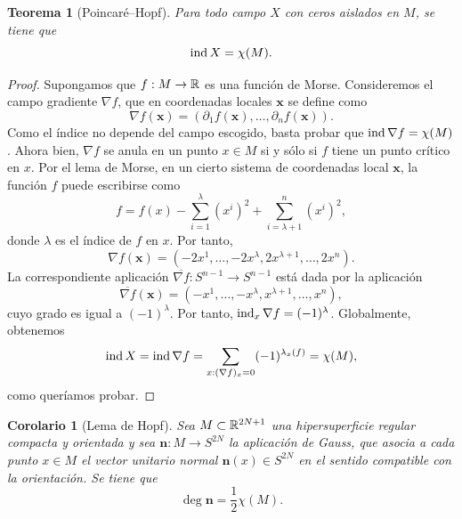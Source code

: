 \documentclass[11pt,a4paper]{amsbook}
\newtheorem{thm}[subsection]{Teorema}
\newtheorem{corol}[subsection]{Corolario}
\theoremstyle{remark} \newtheorem{rmk}[subsection]{Observación}
\theoremstyle{definition} \newtheorem{defn}[subsection]{Definición}
\theoremstyle{definition} \newtheorem{ex}[subsection]{Ejemplo}
\theoremstyle{definition} \newtheorem{ej}[subsection]{Ejercicio}
\begin{document}
\begin{thm}[Poincaré--Hopf]
  Para todo campo $X$ con ceros aislados en $M$, se tiene que
  \begin{equation*}
\operatorname{ind} X = \chi(M).
  \end{equation*}
\end{thm}

\begin{proof}
Supongamos que $f:M\rightarrow \mathbb R$ es una función de Morse. Consideremos el campo gradiente $\nabla f$, que en coordenadas locales $\bm{x}$ se define como
\begin{equation*}
\nabla f(\bm{x}) = (\partial_1 f(\bm{x}),\dots,\partial_n f (\bm{x})).
\end{equation*}
Como el índice no depende del campo escogido, basta probar que $\operatorname{ind} \nabla f = \chi(M)$. Ahora bien, $\nabla f$ se anula en un punto $x\in M$ si y sólo si $f$ tiene un punto crítico en $x$. Por el lema de Morse, en un cierto sistema de coordenadas local $\bm{x}$, la función $f$ puede escribirse como
\begin{equation*}
f = f(x) - \sum_{i=1}^\lambda (x^i)^2 + \sum^n_{i=\lambda+1} (x^i)^2,
\end{equation*}
donde $\lambda$ es el índice de $f$ en $x$. Por tanto,
\begin{equation*}
\nabla f(\bm{x}) = (-2x^1,\dots,-2x^\lambda, 2x^{\lambda+1},\dots,2x^{n}).
\end{equation*}
La correspondiente aplicación $\overline{\nabla f}:S^{n-1}\rightarrow S^{n-1}$ está dada por la aplicación
\begin{equation*}
\overline{\nabla f} (\bm{x}) = (-x^1,\dots,-x^\lambda, x^{\lambda+1},\dots,x^n),
\end{equation*}
cuyo grado es igual a $(-1)^\lambda$. Por tanto, $\operatorname{ind}_x \nabla f = (-1)^\lambda$. Globalmente, obtenemos
\begin{equation*}
\operatorname{ind} X = \operatorname{ind} \nabla f = \sum_{x: (\nabla f)_x=0} (-1)^{\lambda_x(f)} = \chi(M),
\end{equation*}
como queríamos probar.
\end{proof}

\begin{corol}[Lema de Hopf]
  Sea $M\subset \mathbb R^{2N+1}$ una hipersuperficie regular compacta y orientada y sea $\bm{n}:M\rightarrow S^{2N}$ la \emph{aplicación de Gauss}, que asocia a cada punto $x\in M$ el \emph{vector unitario normal} $\bm{n}(x)\in S^{2N}$ en el sentido compatible con la orientación. Se tiene que
  \begin{equation*}
\deg \bm{n} = \frac{1}{2}\chi(M).
  \end{equation*}
\end{corol}
\end{document}
